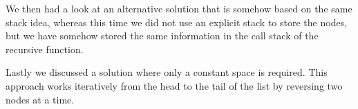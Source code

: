 We then had a look at an alternative solution that is somehow based on the same stack idea, whereas this time we did not use an explicit stack to store the nodes, but we have somehow stored the same information in the 
call stack of the recursive function. 

Lastly we discussed a solution where only a constant space is required. This approach works iteratively from the head to the tail of the list by reversing two nodes at a time.